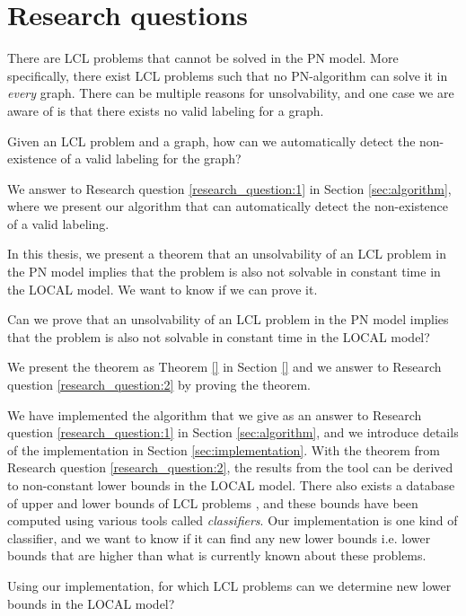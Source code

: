 
\section{Research questions} \label{sec:research_question}

There are LCL problems that cannot be solved in the PN model.
More specifically, there exist LCL problems such that no PN-algorithm can solve it in \emph{every} graph.
There can be multiple reasons for unsolvability, and one case we are aware of is that there exists no valid labeling for a graph.
\begin{researchquestion} \label{research_question:1}
Given an LCL problem and a graph, how can we automatically detect the non-existence of a valid labeling for the graph?
\end{researchquestion}
We answer to Research question \ref{research_question:1} in Section \ref{sec:algorithm}, where we present our algorithm that can automatically detect the non-existence of a valid labeling.

In this thesis, we present a theorem that an unsolvability of an LCL problem in the PN model implies that the problem is also not solvable in constant time in the LOCAL model.
We want to know if we can prove it.
\begin{researchquestion} \label{research_question:2}
Can we prove that an unsolvability of an LCL problem in the PN model implies that the problem is also not solvable in constant time in the LOCAL model?
\end{researchquestion}
We present the theorem as Theorem \ref{} in Section \ref{} and we answer to Research question \ref{research_question:2} by proving the theorem.  %

We have implemented the algorithm that we give as an answer to Research question \ref{research_question:1} in Section \ref{sec:algorithm}, and we introduce details of the implementation in Section \ref{sec:implementation}.
With the theorem from Research question \ref{research_question:2}, the results from the tool can be derived to non-constant lower bounds in the LOCAL model.
There also exists a database of upper and lower bounds of LCL problems \cite{Tereshchenko2021}, and these bounds have been computed using various tools called \emph{classifiers}.
Our implementation is one kind of classifier, and we want to know if it can find any new lower bounds i.e. lower bounds that are higher than what is currently known about these problems.
\begin{researchquestion} \label{research_question:3}
Using our implementation, for which LCL problems can we determine new lower bounds in the LOCAL model?
\end{researchquestion}

